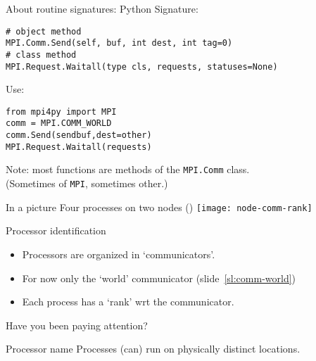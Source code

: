 \begin{python}
\begin{numberedframe}{About routine signatures: Python}
Signature:
\lstset{language=Python}
\begin{lstlisting}
# object method
MPI.Comm.Send(self, buf, int dest, int tag=0)
# class method
MPI.Request.Waitall(type cls, requests, statuses=None)
\end{lstlisting}
Use:
\begin{lstlisting}
from mpi4py import MPI
comm = MPI.COMM_WORLD
comm.Send(sendbuf,dest=other)
MPI.Request.Waitall(requests)
\end{lstlisting}
Note: most functions are methods of the \lstinline{MPI.Comm} class.\\
(Sometimes of \lstinline{MPI}, sometimes other.)
\end{numberedframe}
\end{python}

\begin{numberedframe}{In a picture}
  Four processes on two nodes ()
  \texttt{[image: node-comm-rank]}
\end{numberedframe}

\begin{numberedframe}{Processor identification}
  \begin{itemize}
  \item Processors are organized in `communicators'.
  \item For now only the `world' communicator
    (slide~\ref{sl:comm-world})
  \item Each process has a `rank' wrt the communicator.
  \end{itemize}
\end{numberedframe}


\begin{numberedframe}{Have you been paying attention?}
  
\end{numberedframe}

\begin{exerciseframe}[commrank]
  
\end{exerciseframe}

\begin{exerciseframe}[commrank]
  
\end{exerciseframe}

\begin{numberedframe}{Processor name}
  Processes (can) run on physically distinct locations.

\end{numberedframe}

